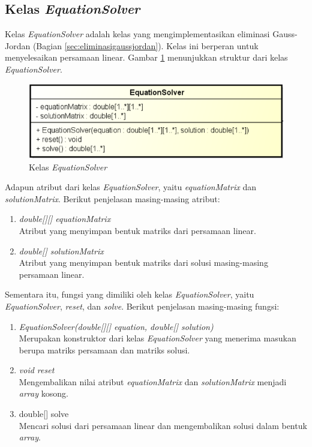 \subsection{Kelas \textit{EquationSolver}}

Kelas \textit{EquationSolver} adalah kelas yang mengimplementasikan eliminasi Gauss-Jordan (Bagian \ref{sec:eliminasigaussjordan}). Kelas ini berperan untuk menyelesaikan persamaan linear. Gambar \ref{fig:classequationsolver} menunjukkan struktur dari kelas \textit{EquationSolver}.

\begin{figure}[H]
	\centering
	\includegraphics[scale=0.7]{Gambar/class_equation_solver}
	\caption{Kelas \textit{EquationSolver}}\label{fig:classequationsolver}
\end{figure}

Adapun atribut dari kelas \textit{EquationSolver}, yaitu \textit{equationMatrix} dan \textit{solutionMatrix}. Berikut penjelasan masing-masing atribut:

\begin{enumerate}
	\item \textit{double[][] equationMatrix} \\
	Atribut yang menyimpan bentuk matriks dari persamaan linear.
	\item \textit{double[] solutionMatrix} \\
	Atribut yang menyimpan bentuk matriks dari solusi masing-masing persamaan linear.
\end{enumerate}

Sementara itu, fungsi yang dimiliki oleh kelas \textit{EquationSolver}, yaitu \textit{EquationSolver}, \textit{reset}, dan \textit{solve}. Berikut penjelasan masing-masing fungsi:

\begin{enumerate}
	\item \textit{EquationSolver(double[][] equation, double[] solution)} \\
	Merupakan konstruktor dari kelas \textit{EquationSolver} yang menerima masukan berupa matriks persamaan dan matriks solusi.
	\item \textit{void reset} \\
	Mengembalikan nilai atribut \textit{equationMatrix} dan \textit{solutionMatrix} menjadi \textit{array} kosong.
	\item double[] solve \\
	Mencari solusi dari persamaan linear dan mengembalikan solusi dalam bentuk \textit{array}.
\end{enumerate}

